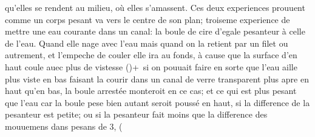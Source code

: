 qu'elles se rendent au milieu, o\`{u} elles s'amassent.
%
%
\pend%
\pstart%
Ces deux%
experiences\protect{} prouuent comme un corps pesant va vers le centre de son plan;
troiseme experience\protect{} de mettre une eau\protect{} courante dans un canal:
la boule de cire\protect{} d'egale
pesanteur\protect{} \`{a} celle de \protect{}l'eau.
Quand elle nage avec l'eau\protect{}
mais quand on la retient par un filet ou autrement, et l'empeche de couler elle ira au fonds, \`{a} cause que la surface d'en haut coule auec plus de vistesse
%
(\hspace{-1.2mm}\phantom)+~si on pouuait faire en sorte que l'eau\protect{} aille plus viste en bas faisant la courir dans un canal de verre\protect{} transparent plus apre en haut qu'en bas, la boule arrest\'{e}e monteroit en ce cas; et ce qui est plus pesant que l'eau\protect{} car la boule pese bien autant seroit pouss\'{e} en haut, si la difference de la pesanteur\protect{} est petite; ou si la pesanteur\protect{} fait moins que la difference des mouuemens dans
pesans
de 3, \hspace{-1.2mm}\phantom(%
